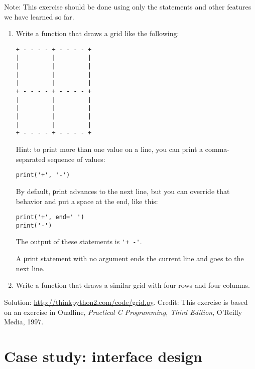 \documentclass[
DIV=11,
fontsize=12,
twoside,
headinclude=false,
titlepage=firstiscover,
abstract=true,
headsepline=true,
footsepline=true,
chapterprefix=true, %
headings=big,
bibliography=totoc,%
captions=tableheading
]{scrbook}
\theoremstyle{definition}
\begin{document}
\begin{exercise}
\normalfont

Note: This exercise should be
done using only the statements and other features we have learned so
far.  

\begin{enumerate}

\item Write a function that draws a grid like the following:

\begin{lstlisting}
+ - - - - + - - - - +
|         |         |
|         |         |
|         |         |
|         |         |
+ - - - - + - - - - +
|         |         |
|         |         |
|         |         |
|         |         |
+ - - - - + - - - - +
\end{lstlisting}
%
Hint: to print more than one value on a line, you can print
a comma-separated sequence of values:

\begin{lstlisting}
print('+', '-')
\end{lstlisting}
%
By default, {\texttt print} advances to the next line, but you
can override that behavior and put a space at the end, like this:

\begin{lstlisting}
print('+', end=' ')
print('-')
\end{lstlisting}
%
The output of these statements is \verb"'+ -'".

A {\texttt print} statement with no argument ends the current line and
goes to the next line.

\item Write a function that draws a similar grid
with four rows and four columns.

\end{enumerate}

Solution: \url{http://thinkpython2.com/code/grid.py}.
Credit: This exercise is based on an exercise in Oualline, {\em
    Practical C Programming, Third Edition}, O'Reilly Media, 1997.

\end{exercise}





\chapter{Case study: interface design}
\label{turtlechap}
\end{document}
